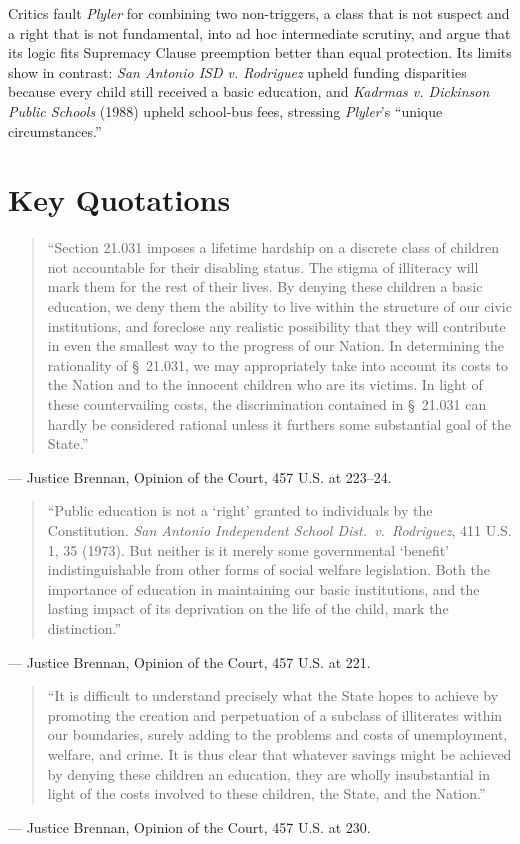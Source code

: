\documentclass[12pt]{article}
\begin{document}
Critics fault \textit{Plyler} for combining two non-triggers, a class that is not suspect and a right that is not fundamental, into ad hoc intermediate scrutiny, and argue that its logic fits Supremacy Clause preemption better than equal protection. Its limits show in contrast: \textit{San Antonio ISD v. Rodriguez} upheld funding disparities because every child still received a basic education, and \textit{Kadrmas v. Dickinson Public Schools} (1988) upheld school-bus fees, stressing \textit{Plyler}'s ``unique circumstances.''

\section{Key Quotations}

\begin{quote}
``Section 21.031 imposes a lifetime hardship on a discrete class of children not accountable for their disabling status. The stigma of illiteracy will mark them for the rest of their lives. By denying these children a basic education, we deny them the ability to live within the structure of our civic institutions, and foreclose any realistic possibility that they will contribute in even the smallest way to the progress of our Nation. In determining the rationality of \S~21.031, we may appropriately take into account its costs to the Nation and to the innocent children who are its victims. In light of these countervailing costs, the discrimination contained in \S~21.031 can hardly be considered rational unless it furthers some substantial goal of the State.''
\end{quote}
\noindent --- Justice Brennan, Opinion of the Court, 457 U.S. at 223--24.

\begin{quote}
``Public education is not a `right' granted to individuals by the Constitution. \textit{San Antonio Independent School Dist.\ v.\ Rodriguez}, 411 U.S. 1, 35 (1973). But neither is it merely some governmental `benefit' indistinguishable from other forms of social welfare legislation. Both the importance of education in maintaining our basic institutions, and the lasting impact of its deprivation on the life of the child, mark the distinction.''
\end{quote}
\noindent --- Justice Brennan, Opinion of the Court, 457 U.S. at 221.

\begin{quote}
``It is difficult to understand precisely what the State hopes to achieve by promoting the creation and perpetuation of a subclass of illiterates within our boundaries, surely adding to the problems and costs of unemployment, welfare, and crime. It is thus clear that whatever savings might be achieved by denying these children an education, they are wholly insubstantial in light of the costs involved to these children, the State, and the Nation.''
\end{quote}
\noindent --- Justice Brennan, Opinion of the Court, 457 U.S. at 230.
\end{document}
